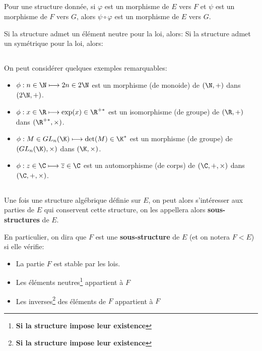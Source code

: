 \subsection*{}
Pour une structure donnée, si \(\varphi\) est un morphisme de \(E\) vers \(F\) et \(\psi\) est un morphisme de \(F\) vers \(G\), alors \(\psi \circ \varphi\) est un morphisme de \(E\) vers \(G\).\<

Si la structure admet un élément neutre pour la loi, alors:
Si la structure admet un symétrique pour la loi, alors:
\subsection*{}
On peut considérer quelques exemples remarquables:
\begin{itemize}
   \item \(\phi: n \in \N \longmapsto 2n \in 2\N\) est un morphisme (de monoide) de \((\N, +)\) dans \((2\N, +)\).
   \item \(\phi: x \in \R \longmapsto \exp(x) \in \R^{+*}\) est un isomorphisme (de groupe) de \((\R, +)\) dans \((\R^{+*}, \times)\).
   \item \(\phi: M \in GL_{n}(\K) \longmapsto \det(M) \in \K^*\) est un morphisme (de groupe) de \((GL_{n}(\K), \times)\) dans \((\K, \times)\).
   \item \(\phi: z \in \C \longmapsto \overline{z} \in \C\) est un automorphisme (de corps) de \((\C, +, \times)\) dans \((\C, +, \times)\).
\end{itemize}
\pagebreak
\subsection*{}
Une fois une structure algébrique définie sur \(E\), on peut alors s'intéresser aux parties de \(E\) qui conservent cette structure, on les appellera alors \textbf{sous-structures} de \(E\).\<

En particulier, on dira que \(F\) est une \textbf{sous-structure} de \(E\) (et on notera \(F < E\)) si elle vérifie:
\begin{itemize}
   \item La partie \(F\) est stable par les lois.
   \item Les éléments neutres\footnote[1]{\textbf{Si la structure impose leur existence}} appartient à \(F\) 
   \item Les inverses\footnote[2]{\textbf{Si la structure impose leur existence}} des éléments de \(F\) appartient à \(F\)
\end{itemize}

